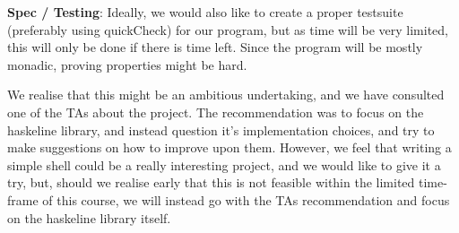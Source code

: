 \documentclass[11pt,a4paper]{article}
\begin{document}
\textbf{Spec / Testing}: Ideally, we would also like to create  a proper testsuite
(preferably using quickCheck) for our program, but as time will be very limited,
this will only be done if there is time left. Since the program will be mostly
monadic, proving properties might be hard.

We realise that this might be an ambitious undertaking, and we have consulted
one of the TAs about the project. The recommendation was to focus on the
haskeline library, and instead question it’s implementation choices, and try to
make suggestions on how to improve upon them. However, we feel that writing a
simple shell could be a really interesting project, and we would like to give it
a try, but, should we realise early that this is not feasible within the limited
time-frame of this course, we will instead go with the TAs recommendation and
focus on the haskeline library itself.
\end{document}
